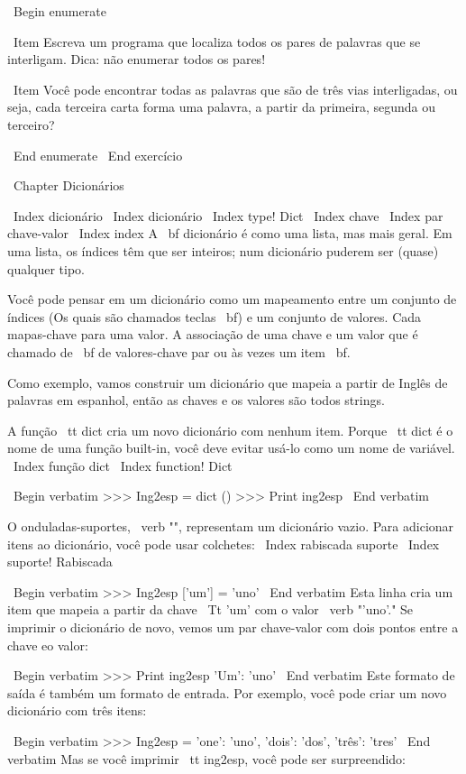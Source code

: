 \documentclass[10pt]{book}
\begin{document}
{{{{{{{\ Begin {enumerate}

\ Item Escreva um programa que localiza todos os pares de palavras que se interligam.
  Dica: não enumerar todos os pares!

\ Item Você pode encontrar todas as palavras que são de três vias interligadas, ou seja,
  cada terceira carta forma uma palavra, a partir da primeira, segunda ou
  terceiro?

\ End {enumerate}
\ End {} exercício


\ Chapter {} Dicionários

\ Index {} dicionário
\ Index {} dicionário
\ Index {type! Dict}
\ Index {chave}
\ Index {par chave-valor}
\ Index {index}
A {\ bf dicionário} é como uma lista, mas mais geral. Em uma lista,
os índices têm que ser inteiros; num dicionário puderem
ser (quase) qualquer tipo.

Você pode pensar em um dicionário como um mapeamento entre um conjunto de índices
(Os quais são chamados teclas {\ bf}) e um conjunto de valores. Cada mapas-chave para uma
valor. A associação de uma chave e um valor que é chamado de {\ bf
  de valores-chave par} ou {às vezes um item \ bf}.

Como exemplo, vamos construir um dicionário que mapeia a partir de Inglês
de palavras em espanhol, então as chaves e os valores são todos strings.

A função {\ tt dict} cria um novo dicionário com nenhum item.
Porque {\ tt dict} é o nome de uma função built-in, você
deve evitar usá-lo como um nome de variável.
\ Index {função dict}
\ Index {function! Dict}

\ Begin {verbatim}
>>> Ing2esp = dict ()
>>> Print ing2esp
{}
\ End {verbatim}

O onduladas-suportes, \ verb "{}", representam um dicionário vazio.
Para adicionar itens ao dicionário, você pode usar colchetes:
\ Index {rabiscada suporte}
\ Index {suporte! Rabiscada}

\ Begin {verbatim}
>>> Ing2esp ['um'] = 'uno'
\ End {verbatim}
%
Esta linha cria um item que mapeia a partir da chave
{\ Tt 'um'} com o valor \ verb "'uno'." Se imprimir o
dicionário de novo, vemos um par chave-valor com dois pontos
entre a chave eo valor:

\ Begin {verbatim}
>>> Print ing2esp
{'Um': 'uno'}
\ End {verbatim}
%
Este formato de saída é também um formato de entrada. Por exemplo,
você pode criar um novo dicionário com três itens:

\ Begin {verbatim}
>>> Ing2esp = {'one': 'uno', 'dois': 'dos', 'três': 'tres'}
\ End {verbatim}
%
Mas se você imprimir {\ tt ing2esp}, você pode ser surpreendido:

}}}}}}}
\end{document}
